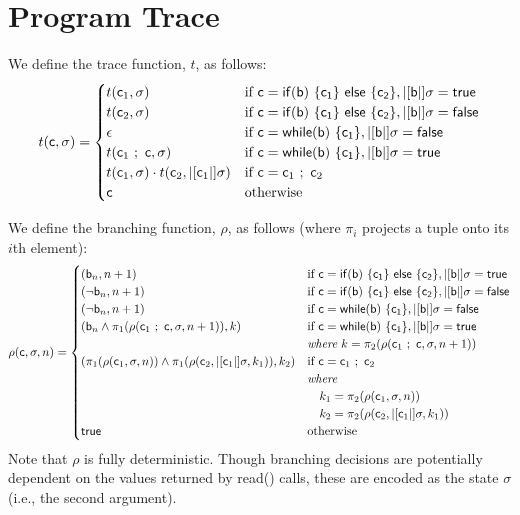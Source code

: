 \documentclass[]{article}
\newcommand{\lsyn}{|[}
\newcommand{\rsyn}{|]}
\begin{document}
\section{Program Trace}

We define the trace function, $t$, as follows:
\[ 
t({\sf c},\sigma) = \begin{cases} 
t({\sf c}_1,\sigma) &
	\mbox{if } {\sf c}={\sf if (b)\ \{ c_1 \}\ else\ \{ c_2 \}},\lsyn {\sf b} \rsyn\sigma = {\sf true} \\ 
t({\sf c}_2,\sigma) &
	\mbox{if } {\sf c}={\sf if (b)\ \{ c_1 \}\ else\ \{ c_2 \}},\lsyn {\sf b} \rsyn\sigma = {\sf false} \\ 
\epsilon &
	\mbox{if } {\sf c}={\sf while (b)\ \{ c_1 \}},\lsyn {\sf b} \rsyn\sigma = {\sf false} \\ 
t({\sf c}_1\ ;\ {\sf c},\sigma) &
	\mbox{if } {\sf c}={\sf while (b)\ \{ c_1 \}},\lsyn {\sf b} \rsyn\sigma = {\sf true} \\ 
t({\sf c}_1,\sigma) \cdot t({\sf c}_2,\lsyn {\sf c}_1 \rsyn \sigma) &
	\mbox{if } {\sf c}={\sf c}_1\ ;\ {\sf c}_2 \\ 
{\sf c} & 
	\mbox{otherwise}
\end{cases}
\]

We define the branching function, $\rho$, as follows (where $\pi_i$ projects a tuple onto its $i$th element):
\[ 
\rho({\sf c},\sigma,n) = \begin{cases} 
({\sf b}_n,n+1) &
	\mbox{if } {\sf c}={\sf if (b)\ \{ c_1 \}\ else\ \{ c_2 \}},\lsyn {\sf b} \rsyn\sigma = {\sf true} \\ 
(\neg {\sf b}_n,n+1) &
	\mbox{if } {\sf c}={\sf if (b)\ \{ c_1 \}\ else\ \{ c_2 \}},\lsyn {\sf b} \rsyn\sigma = {\sf false} \\ 
(\neg {\sf b}_n,n+1) &
	\mbox{if } {\sf c}={\sf while (b)\ \{ c_1 \}},\lsyn {\sf b} \rsyn\sigma = {\sf false} \\ 
({\sf b}_n \wedge \pi_1(\rho({\sf c}_1\ ;\ {\sf c},\sigma,n+1)),k) &\mbox{if } {\sf c}={\sf while (b)\ \{ c_1 \}},\lsyn {\sf b} \rsyn\sigma = {\sf true} \\ 
& \textit{where}\ k = \pi_2(\rho({\sf c}_1\ ;\ {\sf c},\sigma,n+1)) \\
(\pi_1(\rho({\sf c}_1,\sigma,n)) \wedge  \pi_1(\rho({\sf c}_2,\lsyn {\sf c}_1 \rsyn \sigma,k_1)),k_2) &\mbox{if } {\sf c}={\sf c}_1\ ;\ {\sf c}_2 \\ 
& \textit{where} \\
& \quad k_1 = \pi_2(\rho({\sf c}_1,\sigma,n)) \\
& \quad k_2 = \pi_2(\rho({\sf c}_2,\lsyn {\sf c}_1 \rsyn \sigma,k_1)) \\
{\sf true} & \mbox{otherwise}
\end{cases}
\]
Note that $\rho$ is fully deterministic. Though branching decisions are potentially dependent on the values returned by {\sf read()} calls, these are encoded as the state $\sigma$ (i.e., the second argument).
\end{document}
